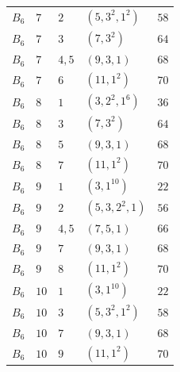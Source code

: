 \documentclass[11pt,a4paper]{amsart}
\numberwithin{equation}{section}
\theoremstyle{definition}
\theoremstyle{remark}
\begin{document}
{\begin{longtable}{@{}p{}p{}p{}p{}p{}@{}}
$B_{6}$&$7$&$2$&$(5,3^{2},1^{2})$&$58$\\
$B_{6}$&$7$&$3$&$(7,3^{2})$&$64$\\
$B_{6}$&$7$&$4,5$&$(9,3,1)$&$68$\\
$B_{6}$&$7$&$6$&$(11,1^{2})$&$70$\\
$B_{6}$&$8$&$1$&$(3,2^{2},1^{6})$&$36$\\
$B_{6}$&$8$&$3$&$(7,3^{2})$&$64$\\
$B_{6}$&$8$&$5$&$(9,3,1)$&$68$\\
$B_{6}$&$8$&$7$&$(11,1^{2})$&$70$\\
$B_{6}$&$9$&$1$&$(3,1^{10})$&$22$\\
$B_{6}$&$9$&$2$&$(5,3,2^{2},1)$&$56$\\
$B_{6}$&$9$&$4,5$&$(7,5,1)$&$66$\\
$B_{6}$&$9$&$7$&$(9,3,1)$&$68$\\
$B_{6}$&$9$&$8$&$(11,1^{2})$&$70$\\
$B_{6}$&$10$&$1$&$(3,1^{10})$&$22$\\
$B_{6}$&$10$&$3$&$(5,3^{2},1^{2})$&$58$\\
$B_{6}$&$10$&$7$&$(9,3,1)$&$68$\\
$B_{6}$&$10$&$9$&$(11,1^{2})$&$70$\\
\end{longtable}
}
\end{document}
